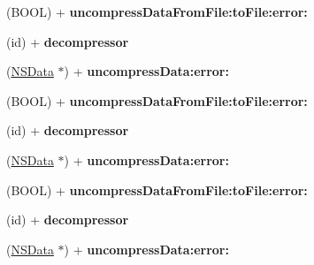 \begin{DoxyCompactItemize}
\item 
\hypertarget{interface_a_s_i_data_decompressor_ade3cc9ba926998aa996714734667a7af}{
(\-B\-O\-O\-L) + {\bfseries uncompress\-Data\-From\-File\-:to\-File\-:error\-:}}
\label{interface_a_s_i_data_decompressor_ade3cc9ba926998aa996714734667a7af}

\item 
\hypertarget{interface_a_s_i_data_decompressor_a1d8177f77b67ffe4651a0310acd667c9}{
(id) + {\bfseries decompressor}}
\label{interface_a_s_i_data_decompressor_a1d8177f77b67ffe4651a0310acd667c9}

\item 
\hypertarget{interface_a_s_i_data_decompressor_ab666cc2cd675eca62a094bb837616a8e}{
(\hyperlink{class_n_s_data}{\-N\-S\-Data} $\ast$) + {\bfseries uncompress\-Data\-:error\-:}}
\label{interface_a_s_i_data_decompressor_ab666cc2cd675eca62a094bb837616a8e}

\item 
\hypertarget{interface_a_s_i_data_decompressor_ade3cc9ba926998aa996714734667a7af}{
(\-B\-O\-O\-L) + {\bfseries uncompress\-Data\-From\-File\-:to\-File\-:error\-:}}
\label{interface_a_s_i_data_decompressor_ade3cc9ba926998aa996714734667a7af}

\item 
\hypertarget{interface_a_s_i_data_decompressor_a1d8177f77b67ffe4651a0310acd667c9}{
(id) + {\bfseries decompressor}}
\label{interface_a_s_i_data_decompressor_a1d8177f77b67ffe4651a0310acd667c9}

\item 
\hypertarget{interface_a_s_i_data_decompressor_ab666cc2cd675eca62a094bb837616a8e}{
(\hyperlink{class_n_s_data}{\-N\-S\-Data} $\ast$) + {\bfseries uncompress\-Data\-:error\-:}}
\label{interface_a_s_i_data_decompressor_ab666cc2cd675eca62a094bb837616a8e}

\item 
\hypertarget{interface_a_s_i_data_decompressor_ade3cc9ba926998aa996714734667a7af}{
(\-B\-O\-O\-L) + {\bfseries uncompress\-Data\-From\-File\-:to\-File\-:error\-:}}
\label{interface_a_s_i_data_decompressor_ade3cc9ba926998aa996714734667a7af}

\item 
\hypertarget{interface_a_s_i_data_decompressor_a1d8177f77b67ffe4651a0310acd667c9}{
(id) + {\bfseries decompressor}}
\label{interface_a_s_i_data_decompressor_a1d8177f77b67ffe4651a0310acd667c9}

\item 
\hypertarget{interface_a_s_i_data_decompressor_ab666cc2cd675eca62a094bb837616a8e}{
(\hyperlink{class_n_s_data}{\-N\-S\-Data} $\ast$) + {\bfseries uncompress\-Data\-:error\-:}}
\label{interface_a_s_i_data_decompressor_ab666cc2cd675eca62a094bb837616a8e}


\end{DoxyCompactItemize}

